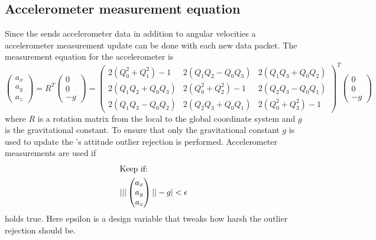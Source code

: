 \subsection{Accelerometer measurement equation}
Since the \abbrIMU sends accelerometer data in addition to angular velocities a accelerometer measurement update can be done with each new \abbrIMU data packet. The measurement equation for the accelerometer is
\begin{equation}
    \begin{pmatrix}
    a_x\\
    a_y\\
    a_z
    \end{pmatrix}
    =
    R^T
    \begin{pmatrix}
    0\\
    0\\
    -g
    \end{pmatrix}
    =
    \begin{pmatrix}
        2(Q_0^2+Q_1^2) - 1 &  2(Q_1 Q_2-Q_0 Q_3) &    2(Q_1 Q_3+Q_0 Q_2)\\
        2(Q_1 Q_2+Q_0 Q_3) &    2(Q_0^2+Q_2^2) - 1 &  2(Q_2 Q_3-Q_0 Q_1)\\
        2(Q_1 Q_3-Q_0 Q_2) &    2(Q_2 Q_3+Q_0 Q_1) &    2(Q_0^2+Q_3^2) - 1
    \end{pmatrix}^T
    \begin{pmatrix}
        0\\
        0\\
        -g
    \end{pmatrix}
\end{equation}
    where $R$ is a rotation matrix from the local to the global coordinate system and $g$ is the gravitational constant. To ensure that only the gravitational constant $g$ is used to update the \abbrROV's attitude outlier rejection is performed. Accelerometer measurements are used if 
\begin{align*}
    \intertext{Keep if: }
    | ||
    \begin{pmatrix}
        a_x\\
        a_y\\
        a_z
    \end{pmatrix}||
    -g
     | < \epsilon
\end{align*} holds true.
Here epsilon is a design variable that tweaks how harsh the outlier rejection should be.


